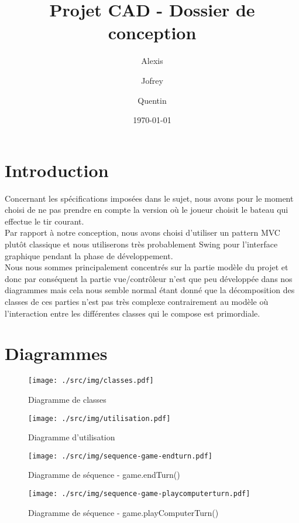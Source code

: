 \documentclass[11pt]{article} %
\title{Projet CAD - Dossier de conception}
\author{Alexis \bsc{Lanoix} \and Jofrey \bsc{Luc} \and Quentin \bsc{Sonrel}}
\date\today
\begin{document}

\maketitle

\section{Introduction}

Concernant les spécifications imposées dans le sujet, nous avons pour le moment choisi de ne pas prendre en compte la version où le joueur choisit le bateau qui effectue le tir courant.\\

Par rapport à notre conception, nous avons choisi d'utiliser un pattern MVC plutôt classique et nous utiliserons très probablement Swing pour l'interface graphique pendant la phase de développement.\\

Nous nous sommes principalement concentrés sur la partie modèle du projet et donc par conséquent la partie vue/contrôleur n'est que peu développée dans nos diagrammes mais cela nous semble normal étant donné que la décomposition des classes de ces parties n'est pas très complexe contrairement au modèle où l'interaction entre les différentes classes qui le compose est primordiale.

\newpage

\section{Diagrammes}

\begin{figure}[h!]
	\centering
	\texttt{[image: ./src/img/classes.pdf]}
	\caption{Diagramme de classes}
\end{figure}

\begin{figure}[h!]
	\centering
	\texttt{[image: ./src/img/utilisation.pdf]}
	\caption{Diagramme d'utilisation}
\end{figure}

\begin{figure}[h!]
	\centering
	\texttt{[image: ./src/img/sequence-game-endturn.pdf]}
	\caption{Diagramme de séquence - game.endTurn()}
\end{figure}

\begin{figure}[h!]
	\centering
	\texttt{[image: ./src/img/sequence-game-playcomputerturn.pdf]}
	\caption{Diagramme de séquence - game.playComputerTurn()}
\end{figure}
\end{document}
